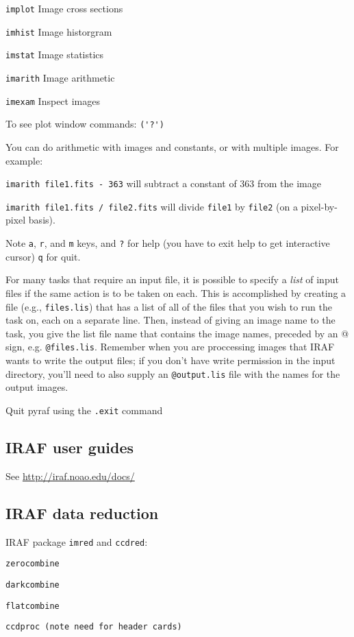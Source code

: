 \documentclass{article}
\begin{document}
\begin{list}{}
    \item \verb|implot| Image cross sections
    \item \verb|imhist| Image historgram
    \item \verb|imstat| Image statistics
    \item \verb|imarith| Image arithmetic
    \item \verb|imexam| Inspect images
\end{list}
To see plot window commands: \verb|('?')|

You can do arithmetic with images and
constants, or with multiple images. For example:
\begin{list}{}
    \item \verb|imarith file1.fits - 363|
        will subtract a constant of 363 from the image
    \item \verb|imarith file1.fits / file2.fits|
        will divide \texttt{file1} by \texttt{file2} (on a pixel-by-pixel basis).
\end{list}

Note \verb|a|, \verb|r|, and \verb|m| keys, and \verb|?|
for help (you have to exit help to get interactive cursor)
\verb|q| for quit.

For many tasks that require an input file, it is possible to specify a
\emph{list} of input files if the same action is to be taken on each.
This is accomplished by creating a file (e.g., \verb|files.lis|)
that has a list of
all of the files that you wish to run the task on, each on a separate
line. Then, instead of giving an image name to the task, you give the
list file name that contains the image names, preceded by an @ sign,
e.g. \verb|@files.lis|. Remember when you are proccessing images that IRAF
wants to write the output files; if you don't have write permission in
the input directory, you'll need to also supply an \verb|@output.lis| file
with the names for the output images.

Quit pyraf using the \verb|.exit| command

\subsection*{IRAF user guides}
See \url{http://iraf.noao.edu/docs/}

\subsection*{IRAF data reduction}
IRAF package \verb|imred| and \verb|ccdred|:
\begin{list}{}
\item \verb|zerocombine|
\item \verb|darkcombine|
\item \verb|flatcombine|
\item \verb|ccdproc (note need for header cards)|
\end{list}
\end{document}
